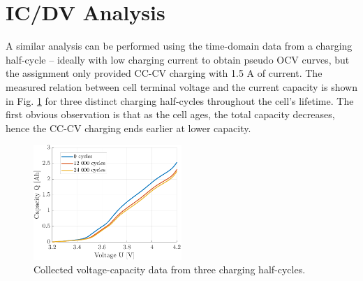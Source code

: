 \section{IC/DV Analysis}

A similar analysis can be performed using the time-domain data from a charging half-cycle -- ideally with low charging current to obtain pseudo OCV curves, but the assignment only provided CC-CV charging with 1.5 A of current. The measured relation between cell terminal voltage and the current capacity is shown in Fig. \ref{fig:14-QU} for three distinct charging half-cycles throughout the cell's lifetime. The first obvious observation is that as the cell ages, the total capacity decreases, hence the CC-CV charging ends earlier at lower capacity.

\begin{figure}
    \centering
    \includegraphics[width=0.5\textwidth]{figures/14/QU.pdf}
    \caption{Collected voltage-capacity data from three charging half-cycles.}
    \label{fig:14-QU}
\end{figure}


